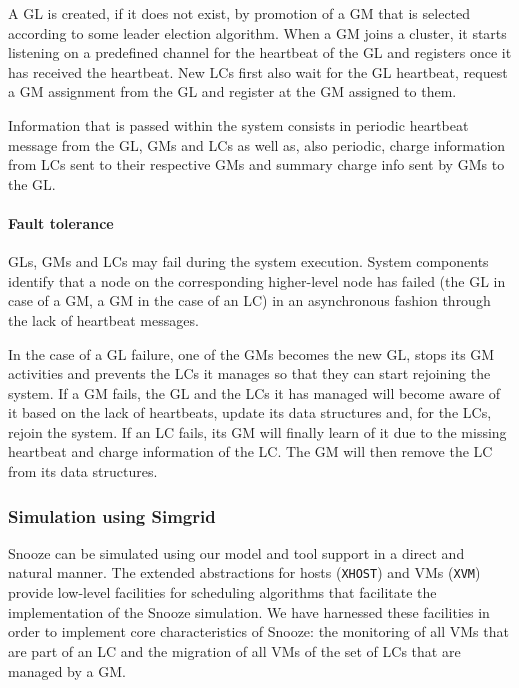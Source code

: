A GL is created, if it does not exist, by promotion of a GM that is
selected according to some leader election algorithm. When a GM joins
a cluster, it starts listening on a predefined channel for the
heartbeat of the GL and registers once it has received the
heartbeat. New LCs first also wait for the GL heartbeat, request a GM
assignment from the GL and register at the GM assigned to them.

Information that is passed within the system consists in periodic
heartbeat message from the GL, GMs and LCs as well as, also periodic,
charge information from LCs sent to their respective GMs and summary
charge info sent by GMs to the GL.


\paragraph{Fault tolerance}

GLs, GMs and LCs may fail during the system execution. System
components identify that a node on the corresponding higher-level node
has failed (the GL in case of a GM, a GM in the case of an LC) in an
asynchronous fashion through the lack of heartbeat messages.

In the case of a GL failure, one of the GMs becomes the new GL, stops
its GM activities and prevents the LCs it manages so that they can
start rejoining the system. If a GM fails, the GL and the LCs it has
managed will become aware of it based on the lack of heartbeats,
update its data structures and, for the LCs, rejoin the system. If an
LC fails, its GM will finally learn of it due to the missing heartbeat
and charge information of the LC. The GM will then remove the LC from
its data structures.

\subsubsection{Simulation using Simgrid}

Snooze can be simulated using our model and tool support in a direct
and natural manner. The extended abstractions  for hosts (\texttt{XHOST}) and VMs
(\texttt{XVM}) provide low-level facilities for scheduling algorithms
that facilitate the implementation of the Snooze simulation. We have
harnessed these facilities in order to implement core characteristics
of Snooze: the monitoring of all VMs that are part of an LC and the
migration of all VMs of the set of LCs that are managed by a GM.

